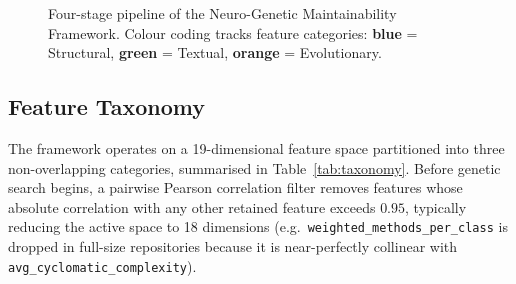 \documentclass[11pt,a4paper]{article}
\begin{document}
\begin{figure}[!t]
\caption{Four-stage pipeline of the Neuro-Genetic Maintainability Framework.
Colour coding tracks feature categories: \textcolor{structcol}{\textbf{blue}} =
Structural, \textcolor{textcol}{\textbf{green}} = Textual,
\textcolor{evolcol}{\textbf{orange}} = Evolutionary.}
\label{fig:pipeline}
\end{figure}

\subsection{Feature Taxonomy}
\label{subsec:features}

The framework operates on a 19-dimensional feature space partitioned into
three non-overlapping categories, summarised in Table~\ref{tab:taxonomy}.
Before genetic search begins, a pairwise Pearson correlation filter removes
features whose absolute correlation with any other retained feature exceeds
$0.95$, typically reducing the active space to 18 dimensions
(e.g.\ \texttt{weighted\_methods\_per\_class} is dropped in full-size repositories
because it is near-perfectly collinear with \texttt{avg\_cyclomatic\_complexity}).
\end{document}
